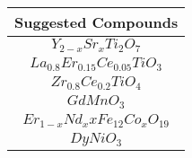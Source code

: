 \documentclass[journal]{IEEEtran}
\begin{document}
\begin{multicols}{2}
\begin{tabular}{|c|}
		\end{tabular}
	
		\begin{tabular}{|c|}
			\hline
		\textbf{	Suggested Compounds}  \\
			\hline
			$Y_{2-x}Sr_xTi_2O_7$ \\
			\hline
			$La_0.8Er_0.15Ce_0.05TiO_3$ \\
			\hline
			$Zr_0.8Ce_0.2TiO_4$ \\
			\hline
			$GdMnO_3$ \\
			\hline
			$Er_{1-x}Nd_xxFe_12Co_xO_{19}$ \\
			\hline
			$DyNiO_3$ \\
			\hline
			
		\end{tabular}


%
%




\end{multicols}
\end{document}
